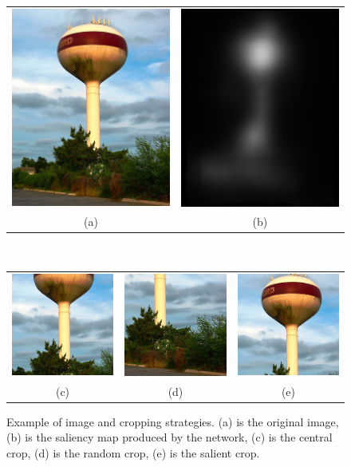 \documentclass[English]{style/ic-tese-v3}
\begin{document}
\begin{figure}
\scriptsize
\begin{center}
    \begin{tabular} {cc}
    \includegraphics[width=0.25\linewidth]{./img/crops/11-raw.JPEG} &
    \includegraphics[width=0.25\linewidth]{./img/crops/11-sals.png} \\
    (a) & (b) \\
    \end{tabular}\\
    \begin{tabular} {ccc}
    \includegraphics[width=0.2\linewidth]{./img/crops/11-central.JPEG} &
    \includegraphics[width=0.2\linewidth]{./img/crops/11-rand.JPEG} &
    \includegraphics[width=0.2\linewidth]{./img/crops/11-soft.JPEG} \\
    (c) & (d) & (e)\\
    \end{tabular}
\caption{\small Example of image and cropping strategies.
    (a) is the original image, (b) is the saliency map produced by the network,
    (c) is the central crop, (d) is the random crop, (e) is the salient crop.}
\label{fig:exp3}
\end{center}
\end{figure}
\end{document}
